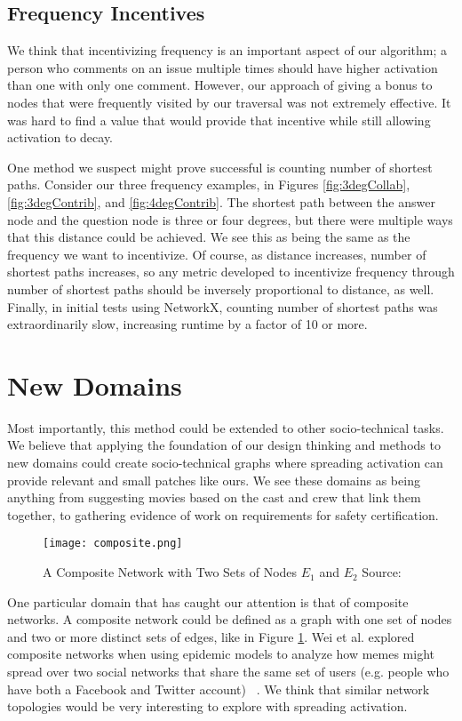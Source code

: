 \subsection{Frequency Incentives}
We think that incentivizing frequency is an important aspect of our algorithm; a person who comments on an issue multiple times should have higher activation than one with only one comment. However, our approach of giving a bonus to nodes that were frequently visited by our traversal was not extremely effective. It was hard to find a value that would provide that incentive while still allowing activation to decay.

One method we suspect might prove successful is counting number of shortest paths. Consider our three frequency examples, in Figures \ref{fig:3degCollab}, \ref{fig:3degContrib}, and \ref{fig:4degContrib}. The shortest path between the answer node and the question node is three or four degrees, but there were multiple ways that this distance could be achieved. We see this as being the same as the frequency we want to incentivize. Of course, as distance increases, number of shortest paths increases, so any metric developed to incentivize frequency through number of shortest paths should be inversely proportional to distance, as well. Finally, in initial tests using NetworkX, counting number of shortest paths was extraordinarily slow, increasing runtime by a factor of 10 or more.

\section{New Domains}
Most importantly, this method could be extended to other socio-technical tasks. We believe that applying the foundation of our design thinking and methods to new domains could create socio-technical graphs where spreading activation can provide relevant and small patches like ours. We see these domains as being anything from suggesting movies based on the cast and crew that link them together, to gathering evidence of work on requirements for safety certification.

\begin{figure}[ht]
	\centering
	\texttt{[image: composite.png]}
	\caption{A Composite Network with Two Sets of Nodes $E_{1}$ and $E_{2}$ Source: ~\cite{memescomposite}}
	\label{fig:composite}
\end{figure}

One particular domain that has caught our attention is that of composite networks. A composite network could be defined as a graph with one set of nodes and two or more distinct sets of edges, like in Figure \ref{fig:composite}. Wei et al. explored composite networks when using epidemic models to analyze how memes might spread over two social networks that share the same set of users (e.g. people who have both a Facebook and Twitter account) ~\cite{memescomposite}. We think that similar network topologies would be very interesting to explore with spreading activation.

